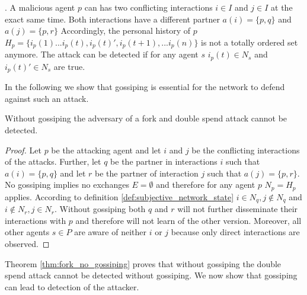 \begin{defn}. A malicious agent $p$ can has two conflicting interactions 
    $i \in I$ and $j \in I$ at the exact same time. Both interactions have a different partner $a(i) = \{p, q\}$ 
    and $a(j) = \{p, r\}$ Accordingly, the personal history of $p$ $H_p = \{i_p(1) ... i_p(t), i_p(t)', i_p(t+1), ... i_p(n)\}$ is not a totally ordered set anymore.
    The attack can be detected if for any agent $s$ $i_p(t) \in N_{s}$ and $i_p(t)' \in N_{s}$ are
    true.
\end{defn}

In the following we show that gossiping is essential for the network to defend against such an 
attack. 

\begin{thm}
    \label{thm:fork_no_gossiping}
    Without gossiping the adversary of a fork and double spend attack cannot be detected.
\end{thm}
\begin{proof}
    Let $p$ be the attacking agent and let $i$ and $j$ be the conflicting interactions of the 
    attacks. Further, let $q$ be the partner in interactions $i$ such that $a(i) = \{p, q\}$ and let 
    $r$ be the partner of interaction $j$ such that $a(j) = \{p, r\}$. 
    No gossiping implies no exchanges $E = \emptyset$ and therefore for any agent $p$ $N_p = H_p$
    applies. 
    According to definition \ref{def:subjective_network_state} $i \in N_{q}, j \notin N_{q}$ and 
    $i \notin N_{r}, j \in N_{r}$. Without gossiping both $q$ and $r$ will not further disseminate 
    their interactions with $p$ and therefore will not learn of the other version.
    Moreover, all other agents $s \in P$ are aware of neither $i$ or $j$ because only direct 
    interactions are observed.
\end{proof}

Theorem \ref{thm:fork_no_gossiping} proves that without gossiping the double spend attack cannot be
detected without gossiping. We now show that gossiping can lead to detection of the attacker. 


